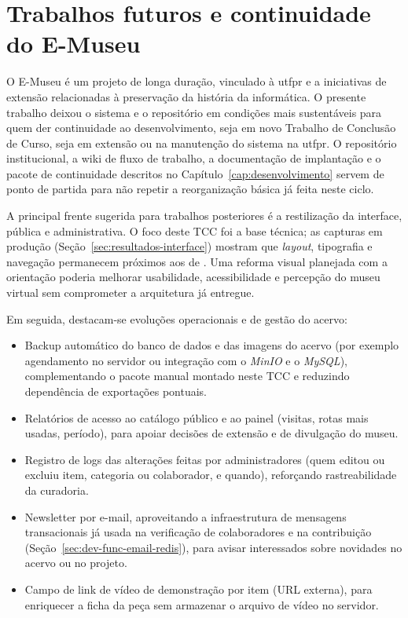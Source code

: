 \section{Trabalhos futuros e continuidade do E-Museu}\label{sec:conclusao-trabalhos-futuros}

O E-Museu é um projeto de longa duração, vinculado à \acrshort{utfpr} e a iniciativas de extensão relacionadas à preservação da história da informática. O presente trabalho deixou o sistema e o repositório em condições mais sustentáveis para quem der continuidade ao desenvolvimento, seja em novo Trabalho de Conclusão de Curso, seja em extensão ou na manutenção do sistema na \acrshort{utfpr}. O repositório institucional, a wiki de fluxo de trabalho, a documentação de implantação e o pacote de continuidade descritos no Capítulo~\ref{cap:desenvolvimento} servem de ponto de partida para não repetir a reorganização básica já feita neste ciclo.

A principal frente sugerida para trabalhos posteriores é a restilização da interface, pública e administrativa. O foco deste TCC foi a base técnica; as capturas em produção (Seção~\ref{sec:resultados-interface}) mostram que \textit{layout}, tipografia e navegação permanecem próximos aos de . Uma reforma visual planejada com a orientação poderia melhorar usabilidade, acessibilidade e percepção do museu virtual sem comprometer a arquitetura já entregue.

Em seguida, destacam-se evoluções operacionais e de gestão do acervo:

\begin{itemize}
    \item Backup automático do banco de dados e das imagens do acervo (por exemplo agendamento no servidor ou integração com o \textit{MinIO} e o \textit{MySQL}), complementando o pacote manual montado neste TCC e reduzindo dependência de exportações pontuais.
    \item Relatórios de acesso ao catálogo público e ao painel (visitas, rotas mais usadas, período), para apoiar decisões de extensão e de divulgação do museu.
    \item Registro de logs das alterações feitas por administradores (quem editou ou excluiu item, categoria ou colaborador, e quando), reforçando rastreabilidade da curadoria.
    \item Newsletter por e-mail, aproveitando a infraestrutura de mensagens transacionais já usada na verificação de colaboradores e na contribuição (Seção~\ref{sec:dev-func-email-redis}), para avisar interessados sobre novidades no acervo ou no projeto.
    \item Campo de link de vídeo de demonstração por item (URL externa), para enriquecer a ficha da peça sem armazenar o arquivo de vídeo no servidor.
\end{itemize}

